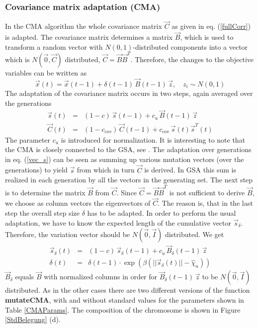 \subsubsection{Covariance matrix adaptation (CMA)}
\label{ss:CMA}
In the CMA algorithm the whole covariance matrix $\vec{C}$ as given in
eq. (\ref{fullCorr}) is adapted. The covariance matrix determines a
matrix $\vec{B}$, which is used to transform a random vector with
$N(0,1)$-distributed components into a vector which is
$N(\vec{0},\vec{C})$ distributed,
$\vec{C}=\vec{B}\vec{B}^T$. Therefore, the changes to the objective
variables can be written as 
\begin{equation}
\vec{x}(t) = \vec{x}(t-1) + \delta(t-1)\,\vec{B}(t-1)\,\vec{z},\quad
z_i \sim N(0,1)
\end{equation}
The adaptation of the covariance matrix occurs in two steps, again
averaged over the generations
\begin{eqnarray}
\label{vec_s}
\vec{s}(t) & = & (1-c)\, \vec{s}(t-1) + c_u\,\vec{B}(t-1)\,\vec{z}\\
\vec{C}(t) & = & (1-c_{cov})\, \vec{C}(t-1) + c_{cov} \, \vec{s}(t)\vec{s}^T(t)
\end{eqnarray} 
The parameter $c_u$ is introduced for normalization. It is interesting
to note that the CMA is closely connected to the GSA, see
\cite{Hansen:96}. The adaptation
over generations in eq. (\ref{vec_s}) can be seen as summing up
various mutation vectors (over the generations) to yield $\vec{s}$ from 
which in turn $\vec{C}$ is derived. In GSA this sum is realized in
each generation by all the vectors in the generating set. The next
step is to determine the matrix $\vec{B}$ from $\vec{C}$. Since 
$\vec{C}=\vec{B}\vec{B}^T$ is not sufficient to derive $\vec{B}$,
we choose as column vectors the eigenvectors of $\vec{C}$. The reason
is, that in the last step the overall step size $\delta$ has to be 
adapted. In order to perform the usual adaptation, we have to
know the expected length of the cumulative vector $\vec{s}_{\delta}$.
Therefore, the variation vector should be $N(\vec{0},\vec{I})$
distributed. We get
\begin{eqnarray}
\vec{s}_{\delta}(t) &=& (1-c)\,\vec{s}_{\delta}(t-1) + 
c_u\,\vec{B}_{\delta}(t-1)\,\vec{z}\\
\delta(t) & = & \delta(t-1)\cdot \exp\left(\beta\left(||\vec{s}_{\delta}(t)||-\hat{\chi}_n\right)\right)
\end{eqnarray}
$\vec{B}_\delta$ equals $\vec{B}$ with normalized columns in order for
$\vec{B}_{\delta}(t-1)\,\vec{z}$ to be $N(\vec{0},\vec{I})$
distributed. As in the other cases there are two different versions of
the function {\sffamily\bfseries\small mutateCMA}, with and
without standard values for the parameters shown in Table
\ref{CMAParams}. The composition of
the chromosome is shown in Figure \ref{StdBelegung} (d).

